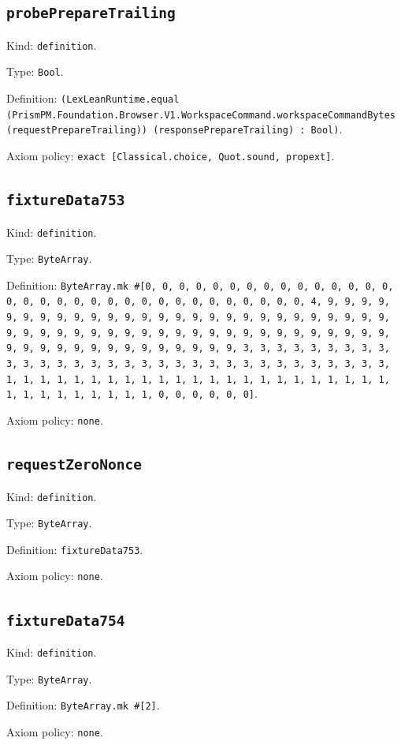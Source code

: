 \documentclass[11pt]{article}
\begin{document}
\subsection*{\texttt{probePrepareTrailing}}
\noindent Kind: \texttt{definition}.\par
\noindent Type: \texttt{Bool}.\par
\noindent Definition: \texttt{(LexLeanRuntime.equal (PrismPM.Foundation.Browser.V1.WorkspaceCommand.workspaceCommandBytes (requestPrepareTrailing)) (responsePrepareTrailing) : Bool)}.\par
\noindent Axiom policy: \texttt{exact [Classical.choice, Quot.sound, propext]}.\par
\subsection*{\texttt{fixtureData753}}
\noindent Kind: \texttt{definition}.\par
\noindent Type: \texttt{ByteArray}.\par
\noindent Definition: \texttt{ByteArray.mk \#[0, 0, 0, 0, 0, 0, 0, 0, 0, 0, 0, 0, 0, 0, 0, 0, 0, 0, 0, 0, 0, 0, 0, 0, 0, 0, 0, 0, 0, 0, 0, 0, 0, 4, 9, 9, 9, 9, 9, 9, 9, 9, 9, 9, 9, 9, 9, 9, 9, 9, 9, 9, 9, 9, 9, 9, 9, 9, 9, 9, 9, 9, 9, 9, 9, 9, 9, 9, 9, 9, 9, 9, 9, 9, 9, 9, 9, 9, 9, 9, 9, 9, 9, 9, 9, 9, 9, 9, 9, 9, 9, 9, 9, 9, 9, 9, 9, 9, 3, 3, 3, 3, 3, 3, 3, 3, 3, 3, 3, 3, 3, 3, 3, 3, 3, 3, 3, 3, 3, 3, 3, 3, 3, 3, 3, 3, 3, 3, 3, 3, 1, 1, 1, 1, 1, 1, 1, 1, 1, 1, 1, 1, 1, 1, 1, 1, 1, 1, 1, 1, 1, 1, 1, 1, 1, 1, 1, 1, 1, 1, 1, 1, 0, 0, 0, 0, 0, 0]}.\par
\noindent Axiom policy: \texttt{none}.\par
\subsection*{\texttt{requestZeroNonce}}
\noindent Kind: \texttt{definition}.\par
\noindent Type: \texttt{ByteArray}.\par
\noindent Definition: \texttt{fixtureData753}.\par
\noindent Axiom policy: \texttt{none}.\par
\subsection*{\texttt{fixtureData754}}
\noindent Kind: \texttt{definition}.\par
\noindent Type: \texttt{ByteArray}.\par
\noindent Definition: \texttt{ByteArray.mk \#[2]}.\par
\noindent Axiom policy: \texttt{none}.\par
\end{document}
